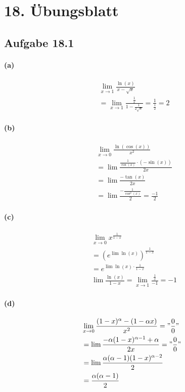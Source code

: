 \section{18. Übungsblatt}

\subsection{Aufgabe 18.1}

\paragraph{(a)}
\begin{align*}
&\lim_{x\rightarrow 1}\frac{\ln(x)}{x-\sqrt{x}}\\
&=\lim_{x\rightarrow1}\frac{\frac{1}{x}}{1-\frac{1}{2\sqrt{x}}}=\frac{1}{\frac{1}{2}}=2
\end{align*}

\paragraph{(b)}
\begin{align*}
&\lim_{x\rightarrow0}\frac{\ln(\cos(x))}{x^2}\\
&=\lim\frac{\frac{1}{\cos(x)}\cdot(-\sin(x))}{2x}\\
&=\lim\frac{-\tan(x)}{2x}\\
&=\lim\frac{-\frac{1}{\cos^2(x)}}{2}=\frac{-1}{2}
\end{align*}

\paragraph{(c)}
\begin{align*}
&\lim_{x\rightarrow0}x^{\frac{1}{1-x}}\\
&=(e^{\lim \ln(x)})^{\frac{1}{1-x}}\\
&=e^{\lim\ln(x)\cdot\frac{1}{1-x}}\\
&\lim\frac{\ln(x)}{1-x}=\lim_{x\rightarrow1}\frac{\frac{1}{x}}{-1}=-1
\end{align*}

\paragraph{(d)}
\begin{align*}
&\lim_{x\rightarrow0}\frac{(1-x)^\alpha-(1-\alpha x)}{x^2}="\frac{0}{0}"\\
&=\lim\frac{-\alpha(1-x)^{\alpha-1}+\alpha}{2x}="\frac{0}{0}"\\
&=\lim\frac{\alpha(\alpha-1)(1-x)^{\alpha-2}}{2}\\
&=\frac{\alpha(\alpha-1)}{2}
\end{align*}

